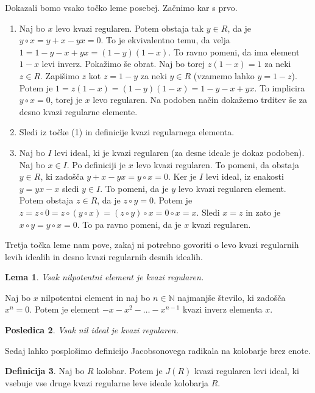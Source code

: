 \documentclass[a4paper, 12pt]{amsart}
\theoremstyle{definition} %
\newtheorem{definicija}{Definicija}[section]
\theoremstyle{plain} %
\newtheorem{lema}[definicija]{Lema}
\newtheorem{posledica}[definicija]{Posledica}
\newcommand{\N}{\mathbb N}
\begin{document}
\proof
Dokazali bomo vsako točko leme posebej. Začnimo kar s prvo.
\begin{enumerate}
\item Naj bo $x$ levo kvazi regularen. Potem obstaja tak $y\in R$, da je $y\circ x = y+x - yx = 0$. To je ekvivalentno temu, da velja $1 = 1 -y-x + yx = (1-y)(1-x)$. To ravno  pomeni, da ima element $1-x$ levi inverz. Pokažimo še obrat. Naj bo torej $z(1-x) = 1$ za neki $z\in R$. Zapišimo $z$ kot $z = 1 -y$ za neki $y\in R$ (vzamemo lahko $y = 1-z$). Potem je $1=z(1-x) = (1-y ) (1-x) = 1 - y -x +yx$. To implicira $y\circ x = 0$, torej je $x$ levo regularen. Na podoben način dokažemo trditev še za desno kvazi regularne elemente.

\item Sledi iz točke (1) in definicije kvazi regularnega elementa. 

\item Naj bo $I$ levi ideal, ki je kvazi regularen (za desne ideale je dokaz podoben). Naj bo $x\in I$. Po definiciji je $x$ levo kvazi regularen. To pomeni, da obstaja $y\in R$, ki zadošča $y+x - yx = y\circ x = 0$. Ker je $I$ levi ideal, iz enakosti $y = yx - x$ sledi $y\in I$. To pomeni, da je $y$ levo kvazi regularen element. Potem obstaja $z \in R$, da je $z\circ y =0$. Potem je $z = z\circ 0 = z \circ (y \circ x) = (z\circ y) \circ x = 0 \circ x = x$. Sledi $x=z$ in zato je $x \circ y = y\circ x = 0$. To pa ravno pomeni, da je $x$ kvazi regularen.
\end{enumerate}
\endproof

Tretja točka leme nam pove, zakaj ni potrebno govoriti o levo kvazi regularnih levih idealih in desno kvazi regularnih desnih idealih.

\begin{lema}
Vsak nilpotentni element je kvazi regularen.
\end{lema}

\proof
Naj bo $x$ nilpotentni element in naj bo $n\in \N$ najmanjše število, ki zadošča $x^n=0$. Potem je element $-x-x^2 - \dots - x^{n-1}$ kvazi inverz elementa $x$.
\endproof

\begin{posledica}
\label{nilIdealJeKvaziRegularen}
Vsak nil ideal je kvazi regularen.
\end{posledica}

Sedaj lahko posplošimo definicijo Jacobsonovega radikala na kolobarje brez enote.

\begin{definicija}
Naj bo $R$ kolobar. Potem je $J(R)$ kvazi regularen levi ideal, ki vsebuje vse druge kvazi regularne leve ideale kolobarja $R$.
\end{definicija}
\end{document}
